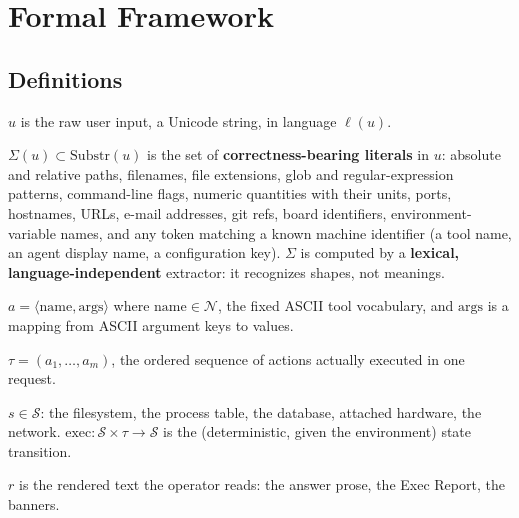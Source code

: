 \section{Formal Framework}
\label{sec:formal-framework}

\subsection{Definitions}
\label{sec:definitions}

\begin{definition}[Utterance]
$u$ is the raw user input, a Unicode string, in language $\ell(u)$.
\end{definition}

\begin{definition}
$\Sigma(u) \subset \mathrm{Substr}(u)$ is the set of \textbf{correctness-bearing literals} in $u$: absolute and relative paths, filenames, file extensions, glob and regular-expression patterns, command-line flags, numeric quantities with their units, ports, hostnames, URLs, e-mail addresses, git refs, board identifiers, environment-variable names, and any token matching a known machine identifier (a tool name, an agent display name, a configuration key). $\Sigma$ is computed by a \textbf{lexical, language-independent} extractor: it recognizes shapes, not meanings.
\end{definition}

\begin{definition}[Action]
$a = \langle \mathrm{name}, \mathrm{args} \rangle$ where $\mathrm{name} \in \mathcal{N}$, the fixed ASCII tool vocabulary, and $\mathrm{args}$ is a mapping from ASCII argument keys to values.
\end{definition}

\begin{definition}[Trace]
$\tau = (a_1, \dots, a_m)$, the ordered sequence of actions actually executed in one request.
\end{definition}

\begin{definition}
$s \in \mathcal{S}$: the filesystem, the process table, the database, attached hardware, the network. $\mathrm{exec}: \mathcal{S} \times \tau \to \mathcal{S}$ is the (deterministic, given the environment) state transition.
\end{definition}

\begin{definition}[Presentation]
$r$ is the rendered text the operator reads: the answer prose, the Exec Report, the banners.
\end{definition}

